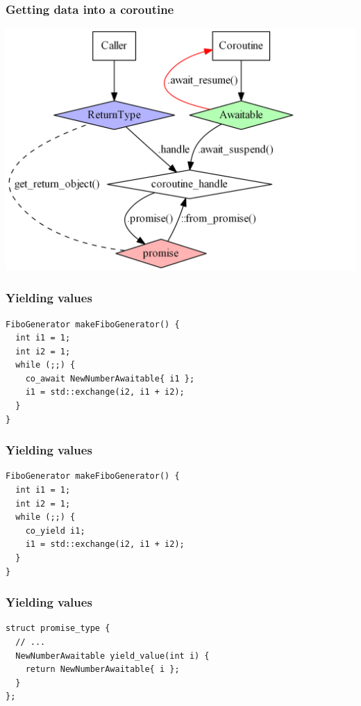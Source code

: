 \documentclass[aspectratio=169]{beamer}
\begin{document}
\begin{frame}
  \frametitle{Getting data into a coroutine}
  
  \begin{center}
  \includegraphics[height=.9\textheight]{corogfx/path_in_040.png}
  \end{center}
\end{frame}


\begin{frame}[fragile]

  \frametitle{Yielding values}

  \begin{lstlisting}[style=cpp20]
FiboGenerator makeFiboGenerator() {
  int i1 = 1;
  int i2 = 1;
  while (;;) {
    co_await NewNumberAwaitable{ i1 };
    i1 = std::exchange(i2, i1 + i2);
  }
}
  \end{lstlisting}

\end{frame}

\begin{frame}[fragile]
  \frametitle{Yielding values}

  \begin{lstlisting}[style=cpp20]
FiboGenerator makeFiboGenerator() {
  int i1 = 1;
  int i2 = 1;
  while (;;) {
    co_yield i1;
    i1 = std::exchange(i2, i1 + i2);
  }
}
  \end{lstlisting}
\end{frame}

\begin{frame}[fragile]
  \frametitle{Yielding values}

  \begin{lstlisting}[style=cpp20]
struct promise_type {
  // ...
  NewNumberAwaitable yield_value(int i) {
    return NewNumberAwaitable{ i };
  }
};
  \end{lstlisting}
\end{frame}
\end{document}
